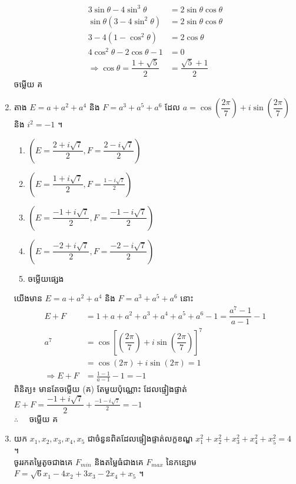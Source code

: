 \documentclass[12pt, a4paper]{article}
\begin{document}
\begin{enumerate}[m]
\begin{center}
\begin{align*}
		3\sin\theta-4\sin^3\theta&=2\sin\theta\cos\theta\\
		\sin\theta\left(3-4\sin^2\theta\right)&=2\sin\theta\cos\theta\\
		3-4\left(1-\cos^2\theta\right)&=2\cos\theta\\
		4\cos^2\theta-2\cos\theta-1&=0\\
		\Rightarrow \cos\theta=\dfrac{1+\sqrt{5}}{2}&=\dfrac{\sqrt{5}+1}{2}
		\end{align*}
		\kml ចម្លើយ \kbk គ
	\end{center}
	\newpage
	\item តាង $E=a+a^2+a^4$ និង $F=a^3+a^5+a^6$ ដែល $a=\cos\left(\dfrac{2\pi}{7}\right)+i\sin\left(\dfrac{2\pi}{7}\right)$ និង $i^2=-1$ ។
	\begin{enumerate}[k,2]
		\item $\left(E=\dfrac{2+i\sqrt{7}}{2},F=\dfrac{2-i\sqrt{7}}{2}\right)$
		\item $\left(E=\dfrac{1+i\sqrt{7}}{2},F=\frac{1-i\sqrt{7}}{2}\right)$
		\item $\left(E=\dfrac{-1+i\sqrt{7}}{2},F=\dfrac{-1-i\sqrt{7}}{2}\right)$
		\item $\left(E=\dfrac{-2+i\sqrt{7}}{2},F=\dfrac{-2-i\sqrt{7}}{2}\right)$
		\item ចម្លើយផ្សេង
	\end{enumerate}
	\answer
	\begin{center}
		យើងមាន $E=a+a^2+a^4$ និង $F=a^3+a^5+a^6$ នោះ\\
		\begin{align*}
		E+F&=1+a+a^2+a^3+a^4+a^5+a^6-1=\dfrac{a^7-1}{a-1}-1\\
		a^7&=\cos\left[\left(\dfrac{2\pi}{7}\right)+i\sin\left(\dfrac{2\pi}{7}\right)\right]^7\\
		&=\cos\left(2\pi\right)+i\sin\left(2\pi\right)=1 \\
		\Rightarrow E+F&=\frac{1-1}{a-1}-1=-1
		\end{align*}
		\kml ពិនិត្យ៖ \kb មានតែចម្លើយ (\kml គ) \kb តែមួយប៉ុណ្ណោះ ដែលផ្ទៀងផ្ទាត់ $E+F=\dfrac{-1+i\sqrt{7}}{2}+\frac{-1-i\sqrt{7}}{2}=-1$\\
		$\therefore \quad$ \kml ចម្លើយ \kbk គ
	\end{center}
	{\color{blue}\hrulefill}
	\item យក $x_1,x_2,x_3,x_4,x_5$ ជាចំនួនពិតដែលផ្ទៀងផ្ទាត់លក្ខខណ្ឌ $x_1^2+x_2^2+x_3^2+x_4^2+x_5^2=4$ ។\\
	ចូររកតម្លៃតូចជាងគេ $F_{min}$ និងតម្លៃធំជាងគេ $F_{max}$ នៃកន្សោម $F=\sqrt{6}x_1-4x_2+3x_3-2x_4+x_5$ ។
	\begin{enumerate}[k,3]

\end{enumerate}
\end{enumerate}
\end{document}

